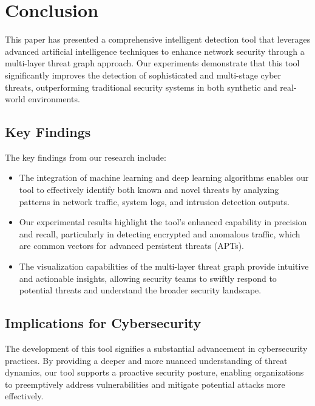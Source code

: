 \section{Conclusion}\label{sec:conclusion}
This paper has presented a comprehensive intelligent detection tool that leverages advanced artificial intelligence techniques to enhance network security through a multi-layer threat graph approach. Our experiments demonstrate that this tool significantly improves the detection of sophisticated and multi-stage cyber threats, outperforming traditional security systems in both synthetic and real-world environments.

\subsection{Key Findings}\label{sec:key-findings}
The key findings from our research include:
\begin{itemize}
    \item The integration of machine learning and deep learning algorithms enables our tool to effectively identify both known and novel threats by analyzing patterns in network traffic, system logs, and intrusion detection outputs.
    \item Our experimental results highlight the tool's enhanced capability in precision and recall, particularly in detecting encrypted and anomalous traffic, which are common vectors for advanced persistent threats (APTs).
    \item The visualization capabilities of the multi-layer threat graph provide intuitive and actionable insights, allowing security teams to swiftly respond to potential threats and understand the broader security landscape.
\end{itemize}

\subsection{Implications for Cybersecurity}\label{sec:implications}
The development of this tool signifies a substantial advancement in cybersecurity practices. By providing a deeper and more nuanced understanding of threat dynamics, our tool supports a proactive security posture, enabling organizations to preemptively address vulnerabilities and mitigate potential attacks more effectively.

